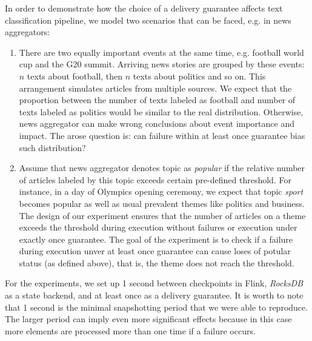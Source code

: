 In order to demonstrate how the choice of a delivery guarantee affects text classification pipeline, we model two scenarios that can be faced, e.g. in news aggregators:
\begin{enumerate}
    \item There are two equally important events at the same time, e.g. football world cup and the G20 summit. Arriving news stories are grouped by these events: $n$ texts about football, then $n$ texts about politics and so on. This arrangement simulates articles from multiple sources. We expect that the proportion between the number of texts labeled as football and number of texts labeled as politics would be similar to the real distribution. Otherwise, news aggregator can make wrong conclusions about event importance and impact. The arose question is: can failure within at least once guarantee bias such distribution?
    \item Assume that news aggregator denotes topic as {\em popular} if the relative number  of articles labeled by this topic exceeds certain pre-defined  threshold. 
    For instance, in a day of Olympics opening ceremony, we expect that topic {\em sport} becomes popular as well as usual prevalent themes like politics and  business.
    The design of our experiment ensures that the number of articles on  a theme exceeds the threshold during execution without failures or execution under exactly once guarantee.
The goal of the experiment is to check if a failure  during execution unver at least once guarantee can cause loses of potular status (as defined above), that is, the theme does not reach the threshold. 
\end{enumerate}


For the experiments, we set up 1 second between checkpoints in Flink, {\em RocksDB} as a state backend, and at least once as a delivery guarantee. It is worth to note that 1 second is the minimal snapshotting period that we were able to reproduce. The larger period can imply even more significant effects because in this case more elements are processed more than one time if a failure occurs.

